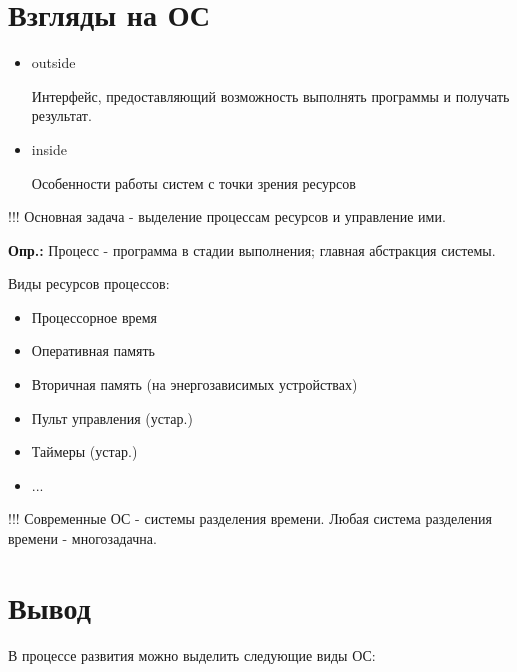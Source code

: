 \documentclass[14pt, a4paper]{article}
\begin{document}
	\section*{Взгляды на ОС}
	
	\begin{itemize}
		\item outside
		
		Интерфейс, предоставляющий возможность выполнять программы и получать результат.
		
		\item inside
		
		Особенности работы систем с точки зрения ресурсов
	\end{itemize}
	
	!!! Основная задача - выделение процессам ресурсов и управление ими.
	
	\textbf{Опр.:} Процесс - программа в стадии выполнения; главная абстракция системы.
	
	Виды ресурсов процессов:
	
	\begin{itemize}
		\item Процессорное время
		
		\item Оперативная память
		
		\item Вторичная память (на энергозависимых устройствах)
		
		\item Пульт управления (устар.)
		
		\item Таймеры (устар.)
		
		\item ...
	\end{itemize}

	!!! Современные ОС - системы разделения времени. Любая система разделения времени - многозадачна.
	
	\section*{Вывод}
	
	В процессе развития можно выделить следующие виды ОС:
	
\end{document}
